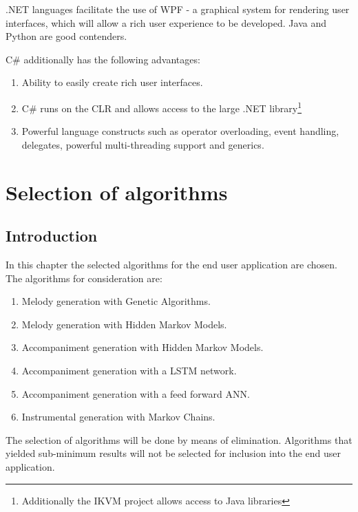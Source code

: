 .NET languages facilitate the use of \ac{WPF} - a graphical system for rendering user interfaces, which will allow a rich user experience to be developed. Java and Python are good contenders.

C\# additionally has the following advantages:
\begin{enumerate}
\item Ability to easily create rich user interfaces.
\item C\# runs on the CLR and allows access to the large .NET library\footnote{Additionally the IKVM project allows access to Java libraries}
\item Powerful language constructs such as operator overloading, event handling, delegates, powerful multi-threading support and generics.
\end{enumerate}


\chapter{Selection of algorithms}
\section{Introduction}
In this chapter the selected algorithms for the end user application are chosen.
The algorithms for consideration are:
\begin{enumerate}
\item Melody generation with Genetic Algorithms.
\item Melody generation with Hidden Markov Models.
\item Accompaniment generation with Hidden Markov Models.
\item Accompaniment generation with a \ac{LSTM} network.
\item Accompaniment generation with a feed forward \ac{ANN}.
\item Instrumental generation with Markov Chains.
\end{enumerate}

The selection of algorithms will be done by means of elimination. Algorithms that yielded sub-minimum results will not be selected for inclusion into the end user application.

